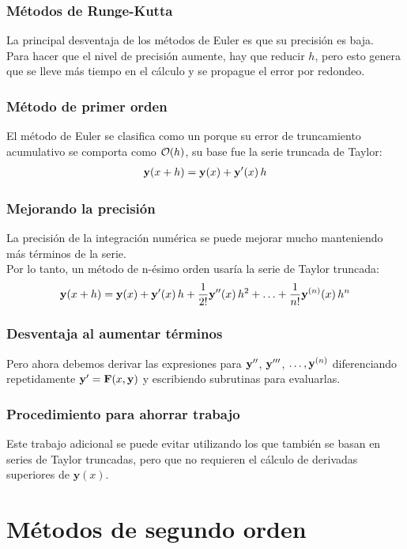 \documentclass[12pt]{beamer}
\begin{document}
\begin{frame}
\frametitle{Métodos de Runge-Kutta}
La principal desventaja de los métodos de Euler es que su precisión es baja.
\\
\bigskip
\pause
Para hacer que el nivel de precisión aumente, hay que reducir $h$, pero esto genera que se lleve más tiempo en el cálculo y se propague el error por redondeo.
\end{frame}
\begin{frame}
\frametitle{Método de primer orden}
El método de Euler se clasifica como un  porque su error de truncamiento acumulativo se comporta como $\order{h}$, \pause su base fue la serie truncada de Taylor:
\begin{align*}
\mathbf{y} (x + h) = \mathbf{y} (x) + {\mathbf{y}}^{\prime} (x) \, h
\end{align*}
\end{frame}
\begin{frame}
\frametitle{Mejorando la precisión}
La precisión de la integración numérica se puede mejorar mucho manteniendo más términos de la serie.
\\
\bigskip
\pause
Por lo tanto, un método de n-ésimo orden usaría la serie de Taylor truncada:
\begin{align*}
\mathbf{y} (x + h) = \mathbf{y} (x) + {\mathbf{y}}^{\prime} (x) \, h + \dfrac{1}{2!} {\mathbf{y}}^{\prime \prime} (x) \, h^{2} + \ldots + \dfrac{1}{n!} {\mathbf{y}}^{(n)} (x) \, h^{n} 
\end{align*}
\end{frame}
\begin{frame}
\frametitle{Desventaja al aumentar términos}
Pero ahora debemos derivar las expresiones para ${\mathbf{y}}^{\prime \prime}$, ${\mathbf{y}}^{\prime \prime \prime}$, $\ldots, {\mathbf{y}}^{(n)}$ diferenciando repetidamente ${\mathbf{y}}^{\prime} = \mathbf{F} (x, \mathbf{y})$ y escribiendo subrutinas para evaluarlas.
\end{frame}
\begin{frame}
\frametitle{Procedimiento para ahorrar trabajo}
Este trabajo adicional se puede evitar utilizando los  \pause que también se basan en series de Taylor truncadas, pero que no requieren el cálculo de derivadas superiores de $\mathbf{y} (x)$.
\end{frame}

\section{Métodos de segundo orden}
\end{document}
